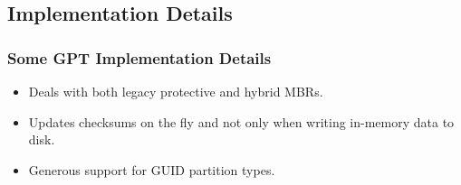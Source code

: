 \subsection{Implementation Details}
\begin{frame}\frametitle{Some GPT Implementation Details}
  \begin{itemize}
  \item Deals with both legacy protective and hybrid MBRs.
  \item Updates checksums on the fly and not only when writing in-memory data to disk.
  \item Generous support for GUID partition types.
  \end{itemize}
\end{frame}
